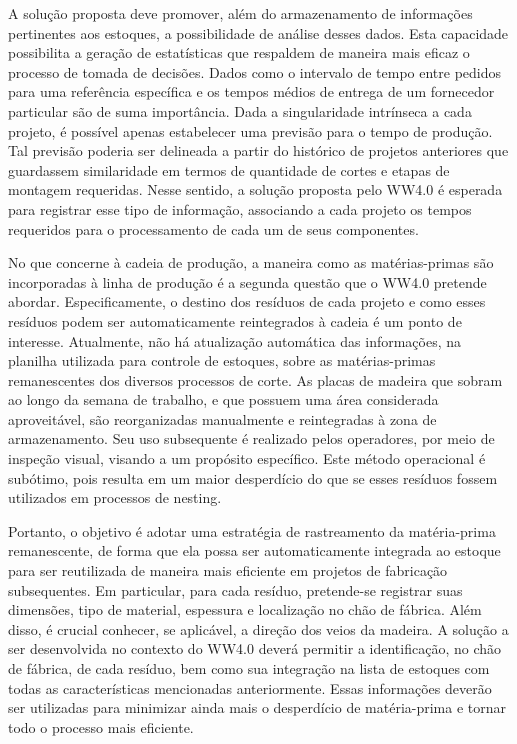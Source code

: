 A solução proposta deve promover, além do armazenamento de informações pertinentes aos estoques, a possibilidade de análise desses dados. Esta capacidade possibilita a geração de estatísticas que respaldem de maneira mais eficaz o processo de tomada de decisões. Dados como o intervalo de tempo entre pedidos para uma referência específica e os tempos médios de entrega de um fornecedor particular são de suma importância. Dada a singularidade intrínseca a cada projeto, é possível apenas estabelecer uma previsão para o tempo de produção. Tal previsão poderia ser delineada a partir do histórico de projetos anteriores que guardassem similaridade em termos de quantidade de cortes e etapas de montagem requeridas. Nesse sentido, a solução proposta pelo WW4.0 é esperada para registrar esse tipo de informação, associando a cada projeto os tempos requeridos para o processamento de cada um de seus componentes.

No que concerne à cadeia de produção, a maneira como as matérias-primas são incorporadas à linha de produção é a segunda questão que o WW4.0 pretende abordar. Especificamente, o destino dos resíduos de cada projeto e como esses resíduos podem ser automaticamente reintegrados à cadeia é um ponto de interesse. Atualmente, não há atualização automática das informações, na planilha utilizada para controle de estoques, sobre as matérias-primas remanescentes dos diversos processos de corte. As placas de madeira que sobram ao longo da semana de trabalho, e que possuem uma área considerada aproveitável, são reorganizadas manualmente e reintegradas à zona de armazenamento. Seu uso subsequente é realizado pelos operadores, por meio de inspeção visual, visando a um propósito específico. Este método operacional é subótimo, pois resulta em um maior desperdício do que se esses resíduos fossem utilizados em processos de nesting.

Portanto, o objetivo é adotar uma estratégia de rastreamento da matéria-prima remanescente, de forma que ela possa ser automaticamente integrada ao estoque para ser reutilizada de maneira mais eficiente em projetos de fabricação subsequentes. Em particular, para cada resíduo, pretende-se registrar suas dimensões, tipo de material, espessura e localização no chão de fábrica. Além disso, é crucial conhecer, se aplicável, a direção dos veios da madeira. A solução a ser desenvolvida no contexto do WW4.0 deverá permitir a identificação, no chão de fábrica, de cada resíduo, bem como sua integração na lista de estoques com todas as características mencionadas anteriormente. Essas informações deverão ser utilizadas para minimizar ainda mais o desperdício de matéria-prima e tornar todo o processo mais eficiente.




